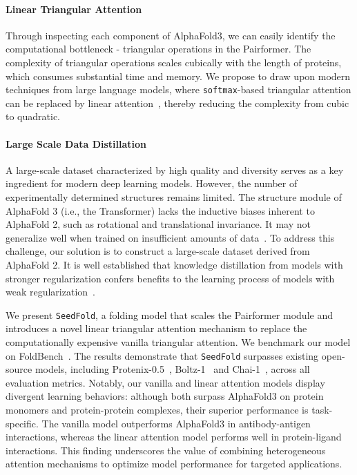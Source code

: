 \documentclass[]{bytedance_seed}
\begin{document}
\paragraph{Linear Triangular Attention} Through inspecting each component of AlphaFold3, we can easily identify the computational bottleneck - triangular operations in the Pairformer. The complexity of triangular operations scales cubically with the length of proteins, which consumes substantial time and memory. We propose to draw upon modern techniques from large language models, where \texttt{softmax}-based triangular attention can be replaced by linear attention~\cite{sun2024liteformer,wu2025flashbias}, thereby reducing the complexity from cubic to quadratic. 

\paragraph{Large Scale Data Distillation} A large-scale dataset characterized by high quality and diversity serves as a key ingredient for modern deep learning models. However, the number of experimentally determined structures remains limited. The structure module of AlphaFold 3 (i.e., the Transformer) lacks the inductive biases inherent to AlphaFold 2, such as rotational and translational invariance. It may not generalize well when trained on insufficient amounts of data~\cite{dosovitskiy2020image}. To address this challenge, our solution is to construct a large-scale dataset derived from AlphaFold 2. It is well established that knowledge distillation from models with stronger regularization confers benefits to the learning process of models with weak regularization~\cite{gu2017non}.

We present \texttt{SeedFold}, a folding model that scales the Pairformer module and introduces a novel linear triangular attention mechanism to replace the computationally expensive vanilla triangular attention. We benchmark our model on FoldBench~\cite{xu2025benchmarking}. The results demonstrate that \texttt{SeedFold} surpasses existing open-source models, including Protenix-0.5~\cite{bytedance2025protenix}, Boltz-1~\cite{passaro2025boltz} and Chai-1~\cite{chai2024chai}, across all evaluation metrics. 
Notably, our vanilla and linear attention models display divergent learning behaviors: although both surpass AlphaFold3 on protein monomers and protein-protein complexes, their superior performance is task-specific. The vanilla model outperforms AlphaFold3 in antibody-antigen interactions, whereas the linear attention model performs well in protein-ligand interactions. This finding underscores the value of combining heterogeneous attention mechanisms to optimize model performance for targeted applications.
\end{document}
